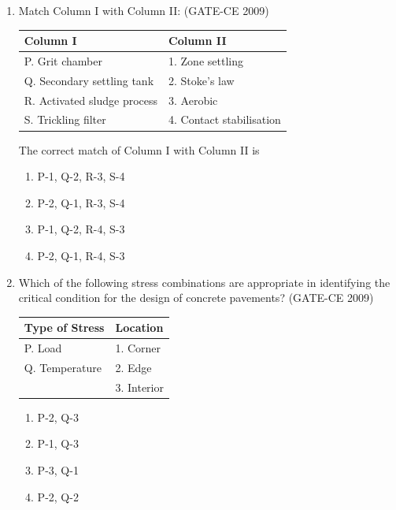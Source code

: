 \documentclass[journal,12pt,onecolumn]{article}
\theoremstyle{remark}
\begin{document}
\begin{enumerate}
    \item Match Column I with Column II: (GATE-CE 2009)
    \begin{center}
    \begin{tabular}{|l|l|}
    \hline
    \textbf{Column I} & \textbf{Column II} \\
    \hline
    P. Grit chamber & 1. Zone settling \\
    Q. Secondary settling tank & 2. Stoke's law \\
    R. Activated sludge process & 3. Aerobic \\
    S. Trickling filter & 4. Contact stabilisation \\
    \hline
    \end{tabular}
    \end{center}
    The correct match of Column I with Column II is
    \begin{enumerate}
        \item P-1, Q-2, R-3, S-4 
        \item P-2, Q-1, R-3, S-4 
        \item P-1, Q-2, R-4, S-3 
        \item P-2, Q-1, R-4, S-3
    \end{enumerate}
    
    \item Which of the following stress combinations are appropriate in identifying the critical condition for the design of concrete pavements? (GATE-CE 2009)
    \begin{center}
    \begin{tabular}{|l|l|}
    \hline
    \textbf{Type of Stress} & \textbf{Location} \\
    \hline
    P. Load & 1. Corner \\
    Q. Temperature & 2. Edge \\
    & 3. Interior \\
    \hline
    \end{tabular}
    \end{center}
    \begin{multicols}{2}
    \begin{enumerate}
        \item P-2, Q-3 
        \item P-1, Q-3 
        \item P-3, Q-1 
        \item P-2, Q-2
    \end{enumerate}
\end{multicols}
    

\end{enumerate}
\end{document}

